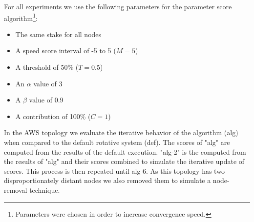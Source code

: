 For all experiments we use the following parameters for the parameter score algorithm\footnote{Parameters were chosen in order to increase convergence speed.}:

\begin{itemize}
    \item The same stake for all nodes
    \item A speed score interval of -5 to 5 ($M=5$)
    \item A threshold of 50\% ($T=0.5$)
    \item An \(\alpha\) value of 3
    \item A \(\beta\) value of 0.9
    \item A contribution of 100\% ($C=1$)
\end{itemize}





In the AWS topology we evaluate the iterative behavior of the algorithm (alg) when compared to the default rotative system (def). The scores of "alg" are computed from the results of the default execution. "alg-2" is the computed from the results of "alg" and their scores combined to simulate the iterative update of scores. This process is then repeated until alg-6. As this topology has two disproportionately distant nodes we also removed them to simulate a node-removal technique. 

